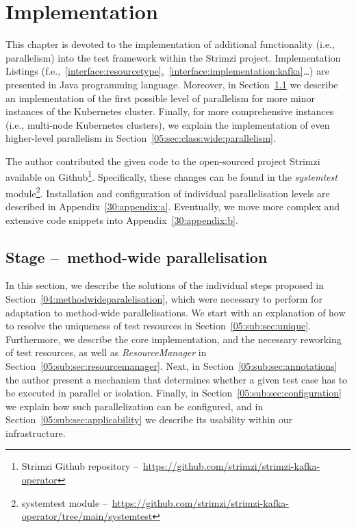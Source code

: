 \chapter{Implementation}
\label{05:chapter:title}

This chapter is devoted to the implementation of additional functionality (i.e., parallelism) into the test framework within the Strimzi project.
Implementation Listings (f.e.,~\ref{interface:resourcetype},~\ref{interface:implementation:kafka}\dots) are presented in Java programming language.
Moreover, in Section~\ref{05:sec:method:wide:parallelism} we describe an implementation of the first possible level of
parallelism for more minor instances of the Kubernetes cluster.
Finally, for more comprehensive instances (i.e., multi-node Kubernetes clusters),
we explain the implementation of even higher-level parallelism in Section~\ref{05:sec:class:wide:parallelism}.

The author contributed the given code to the open-sourced project Strimzi available on
Github\footnote{Strimzi Github repository \---\ \url{https://github.com/strimzi/strimzi-kafka-operator}}.
Specifically, these changes can be found in the \emph{systemtest} module\footnote{systemtest module \---\ \url{https://github.com/strimzi/strimzi-kafka-operator/tree/main/systemtest}}.
Installation and configuration of individual parallelisation levels are described in Appendix~\ref{30:appendix:a}.
Eventually, we move more complex and extensive code snippets into Appendix~\ref{30:appendix:b}.

\section{Stage \---\ method-wide parallelisation}
\label{05:sec:method:wide:parallelism}

In this section, we describe the solutions of the individual steps proposed in Section~\ref{04:methodwideparalelisation},
which were necessary to perform for adaptation to method-wide parallelisations.
We start with an explanation of how to resolve the uniqueness of test resources in Section~\ref{05:sub:sec:unique}.
Furthermore, we describe the core implementation, and the necessary reworking of test resources, as well as \emph{ResourceManager} in Section~\ref{05:sub:sec:resourcemanager}.
Next, in Section~\ref{05:sub:sec:annotations} the author present a mechanism that determines whether a given test case has to be executed in parallel or isolation.
Finally, in Section~\ref{05:sub:sec:configuration} we explain how such parallelization can be configured,
and in Section~\ref{05:sub:sec:applicability} we describe its usability within our infrastructure.

